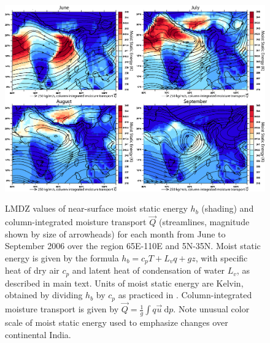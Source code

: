 \begin{figure}[t]
  \noindent\includegraphics[width=36pc,angle=0]{Figures/ch2/fig11lmdz}\\
  \caption{LMDZ values of near-surface moist static energy $h_b$ (shading) and column-integrated moisture transport $\vec{Q}$ (streamlines, magnitude shown by size of arrowheads) for each month from June to September 2006 over the region 65\textdegree E-110\textdegree E and 5\textdegree N-35\textdegree N. Moist static energy is given by the formula $h_b=c_pT+L_vq+gz$, with specific heat of dry air $c_p$ and latent heat of condensation of water $L_v$, as described in main text. Units of moist static energy are Kelvin, obtained by dividing $h_b$ by $c_p$ as practiced in \cite{Boos2013a}. Column-integrated moisture transport is given by $\vec{Q}=\frac{1}{g}\int q\vec{u}\ \mathrm{d}p $. Note unusual color scale of moist static energy used to emphasize changes over continental India.}
  \label{fig:f211}
\end{figure}
